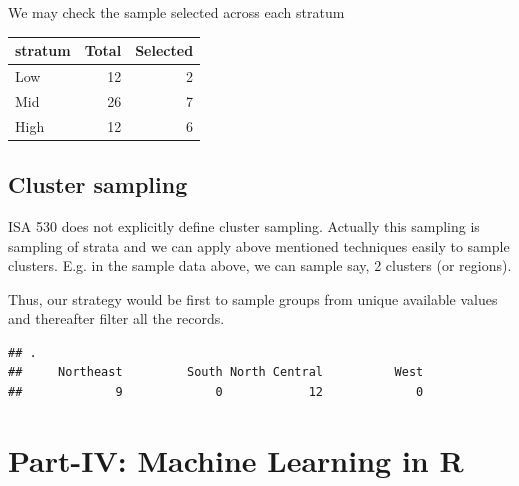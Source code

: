\documentclass[
]{book}
\newenvironment{Shaded}{\begin{snugshade}}{\end{snugshade}}
\newcommand{\AttributeTok}[1]{\textcolor[rgb]{0.13,0.29,0.53}{#1}}
\newcommand{\CommentTok}[1]{\textcolor[rgb]{0.56,0.35,0.01}{\textit{#1}}}
\newcommand{\DecValTok}[1]{\textcolor[rgb]{0.00,0.00,0.81}{#1}}
\newcommand{\FunctionTok}[1]{\textcolor[rgb]{0.13,0.29,0.53}{\textbf{#1}}}
\newcommand{\NormalTok}[1]{#1}
\newcommand{\OtherTok}[1]{\textcolor[rgb]{0.56,0.35,0.01}{#1}}
\newcommand{\SpecialCharTok}[1]{\textcolor[rgb]{0.81,0.36,0.00}{\textbf{#1}}}
\begin{document}
We may check the sample selected across each stratum

\begin{tabular}{l|r|r}
\hline
stratum & Total & Selected\\
\hline
Low & 12 & 2\\
\hline
Mid & 26 & 7\\
\hline
High & 12 & 6\\
\hline
\end{tabular}

\hypertarget{cluster-sampling}{%
\section{Cluster sampling}\label{cluster-sampling}}

ISA 530 does not explicitly define cluster sampling. Actually this sampling is sampling of strata and we can apply above mentioned techniques easily to sample clusters. E.g. in the sample data above, we can sample say, 2 clusters (or regions).

Thus, our strategy would be first to sample groups from unique available values and thereafter filter all the records.

\begin{Shaded}
\end{Shaded}

\begin{verbatim}
## .
##     Northeast         South North Central          West 
##             9             0            12             0
\end{verbatim}

\hypertarget{part-iv-machine-learning-in-r}{%
\chapter*{Part-IV: Machine Learning in R}\label{part-iv-machine-learning-in-r}}
\end{document}
